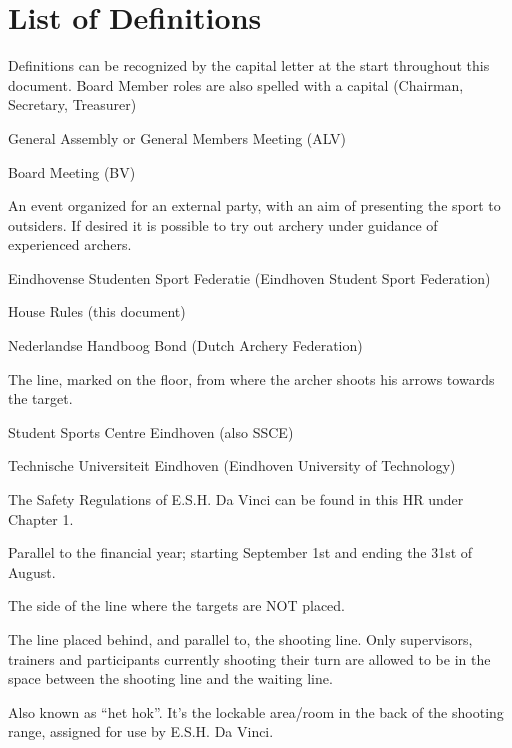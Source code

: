 \documentclass[a4paper]{article}
\begin{document}
\tableofcontents
\pagebreak
\section*{List of Definitions}
{\g Definitions can be recognized by the capital letter at the start throughout this document. Board Member roles are also spelled with a capital (Chairman, Secretary, Treasurer)}

\begin{description}[font=\sffamily\bfseries, leftmargin=1cm, style=nextline]
  \item[GA]
    General Assembly or General Members Meeting (ALV)
  \item[BM]
    Board Meeting (BV)
  \item[Workshop]
    An event organized for an external party, with an aim of presenting the sport to outsiders. If desired it is possible to try out archery under guidance of experienced archers.
    \item[ESSF]
    Eindhovense Studenten Sport Federatie (Eindhoven Student Sport Federation)
    \item[HR]
    House Rules (this document)
    \item[NHB]
    Nederlandse Handboog Bond (Dutch Archery Federation)
    \item[Shooting line]
    The line, marked on the floor, from where the archer shoots his arrows towards the target.
    \item[SSC]
    Student Sports Centre Eindhoven (also SSCE)
    \item[TU/e]
    Technische Universiteit Eindhoven (Eindhoven University of Technology)
    \item[Safety Rules]
    The Safety Regulations of E.S.H. Da Vinci can be found in this HR under Chapter 1.
    \item[Association Year]
    Parallel to the financial year; starting September 1st and ending the 31st of August. 
    \item[“Behind the line”]
    The side of the line where the targets are NOT placed. 
    \item[Waiting line]
The line placed behind, and parallel to, the shooting line. Only supervisors, trainers and participants currently shooting their turn are allowed to be in the space between the shooting line and the waiting line. 
\item[Club Room] Also known as “het hok”. It’s the lockable area/room in the back of the shooting range, assigned for use by E.S.H. Da Vinci.

\end{description}
\end{document}
